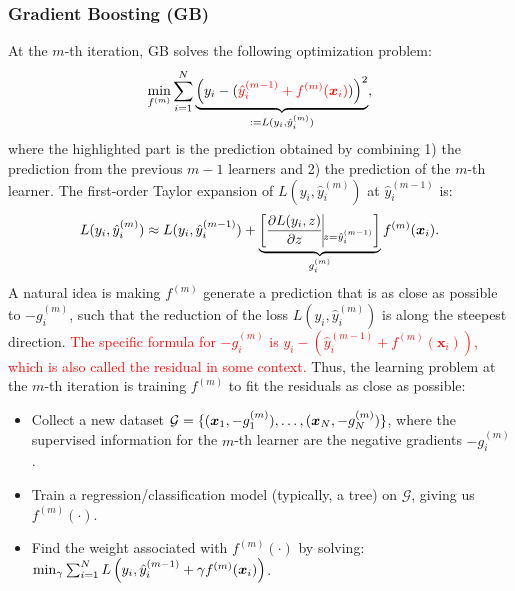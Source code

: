 {        
        
        
\subsubsection{Gradient Boosting (GB)}
        At the $m$-th iteration, GB solves the following optimization problem:
            \begin{equation}\label{XGBoost-model}
                \min_{f^{(m)}} \sum_{i=1}^{N}{
                    \underbrace{\left( y_i - (\textcolor{red}{\hat{y}^{(m-1)}_i + f^{(m)}(\bm{x}_i) } )  \right)^2}_{:=L(y_i, \hat{y}_i^{(m)}) },
                }
            \end{equation}
        where the highlighted part is the prediction obtained by combining 1) the prediction from the previous $m-1$ learners and 2) the prediction of the $m$-th learner. 
        The first-order Taylor expansion of $L(y_i, \hat{y}_i^{(m)})$ at $\hat{y}_i^{(m-1)}$ is:
            \begin{equation}
                L(y_i, \hat{y}_i^{(m)}) \approx L(y_i, \hat{y}_i^{(m-1)}) + \underbrace{\left[ \frac{\partial L(y_i, z)}{\partial z}\vline_{z = \hat{y}_i^{(m-1)}} \right]}_{g_{i}^{(m)}}  f^{(m)}(\bm{x}_i).
            \end{equation}
        A natural idea is making $f^{(m)}$ generate a prediction that is as close as possible to $-g^{(m)}_i$, such that the reduction of the loss $L(y_i, \hat{y}_i^{(m)})$ is along the steepest direction.
        \textcolor{red}{The specific formula for $-g^{(m)}_i$ is $y_i - \left( \hat{y}_i^{(m-1)} + f^{(m)}(\bm{x}_i)  \right)$, which is also called the residual in some context.}
        Thus, the learning problem  at the $m$-th iteration is training $f^{(m)}$ to fit the residuals as close as possible:
            \begin{itemize}
                \item  Collect a new dataset $\mathcal{G}=\{ (\bm{x}_1, -g^{(m)}_1), \ldots, (\bm{x}_N, -g^{(m)}_N) \}$, where the supervised information for the $m$-th learner are the negative gradients $-g_i^{(m)}$.
                \item  Train a regression/classification model (typically, a tree) on $\mathcal{G}$, giving us $f^{(m)}(\cdot)$. 
                \item  Find the weight associated with $f^{(m)}(\cdot)$ by solving: $\min_{\gamma} \sum_{i=1}^{N}{L\left(y_i, \hat{y}_i^{(m-1)} + \gamma f^{(m)}(\bm{x}_i)\right)}$.
            \end{itemize}


}

